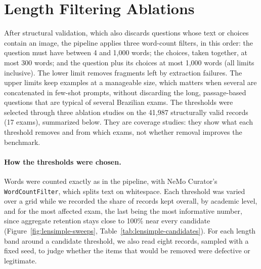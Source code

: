 %
%
%
\providecommand{\LengthAblationFigDir}{ablations/filtering/figures}

\section{Length Filtering Ablations}
\label{app:lensimple}

After structural validation, which also discards questions whose text or
choices contain an image, the pipeline applies three word-count filters,
in this order: the question must have between 4 and 1,000 words; the choices,
taken together, at most 300 words; and the question plus its choices at most
1,000 words (all limits inclusive). The lower limit removes fragments left by
extraction failures. The upper limits keep examples at a manageable size,
which matters when several are concatenated in few-shot prompts, without
discarding the long, passage-based questions that are typical of several
Brazilian exams. The thresholds were selected through three ablation studies
on the 41,987 structurally valid records (17 exams), summarized below. They
are coverage studies: they show what each threshold removes and from which
exams, not whether removal improves the benchmark.

\paragraph{How the thresholds were chosen.} Words were counted exactly as in
the pipeline, with NeMo Curator's \texttt{WordCountFilter}, which splits text
on whitespace. Each threshold was varied over a grid while we recorded the
share of records kept overall, by academic level, and for the most affected
exam, the last being the most informative number, since aggregate retention
stays close to 100\% near every candidate
(Figure~\ref{fig:lensimple-sweeps}, Table~\ref{tab:lensimple-candidates}).
For each length band around a candidate threshold, we also read eight
records, sampled with a fixed seed, to judge whether the items that would be
removed were defective or legitimate.

